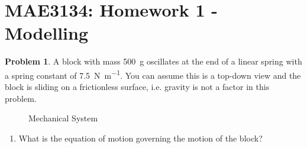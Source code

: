 \documentclass[10pt]{article}
\date{}
\theoremstyle{definition}
\newtheorem{prob}{Problem}[section]
\newenvironment{subprob}%
{\renewcommand{\theenumi}{\alph{enumi}}\renewcommand{\labelenumi}{(\theenumi)}\begin{enumerate}}%
{\end{enumerate}}%
\begin{document}
\pagestyle{empty}
\section*{MAE3134: Homework 1 - Modelling}
\vspace*{-0.4cm}


\begin{prob}
    A block with mass \SI{500}{\gram} oscillates at the end of a linear spring with a spring constant of \SI{7.5}{\newton\per\meter}.
    You can assume this is a top-down view and the block is sliding on a frictionless surface, i.e. gravity is not a factor in this problem.


    \begin{figure}[h]
        \centering
        \begin{scaletikzpicturetowidth}{0.5\textwidth}
        \end{scaletikzpicturetowidth}
        \caption{Mechanical System~\label{fig:mechanical_system}}
    \end{figure}

    \begin{subprob}
    \item What is the equation of motion governing the motion of the block?
    \end{subprob}
\end{prob}
\end{document}
